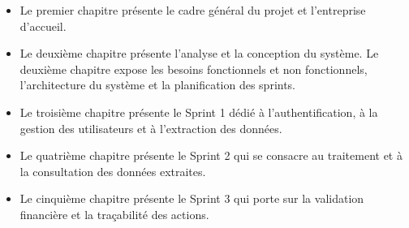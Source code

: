 \begin{itemize}

\item Le premier chapitre présente le cadre général du projet et l’entreprise d’accueil.

\item Le deuxième chapitre présente l’analyse et la conception du système. Le deuxième chapitre expose les besoins fonctionnels et non fonctionnels, l’architecture du système et la planification des sprints.

\item Le troisième chapitre présente le Sprint 1 dédié à l’authentification, à la gestion des utilisateurs et à l’extraction des données.

\item Le quatrième chapitre présente le Sprint 2 qui se consacre au traitement et à la consultation des données extraites.

\item Le cinquième chapitre présente le Sprint 3 qui porte sur la validation financière et la traçabilité des actions.

\end{itemize}